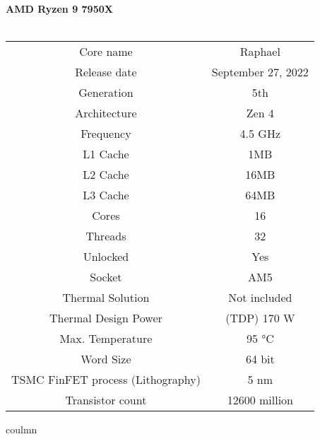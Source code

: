\documentclass[../computer-history.tex]{subfiles}
\begin{document}
\ \\ \\
\textbf{AMD Ryzen 9 7950X} \\ \\
\begin{tabular}{c|c}
    Core name & Raphael \\
    Release date & September 27, 2022 \\
    Generation & 5th \\
    Architecture & Zen 4 \\
    Frequency & 4.5 GHz \\
    L1 Cache & 1MB \\
    L2 Cache & 16MB \\
    L3 Cache & 64MB \\
    Cores & 16 \\
    Threads & 32 \\
    Unlocked & Yes \\
    Socket & AM5 \\
    Thermal Solution & Not included \\
    Thermal Design Power & (TDP)	170 W \\
    Max. Temperature & 95 °C \\
    Word Size & 64 bit \\
    TSMC FinFET process (Lithography) & 5 nm \\
    Transistor count & 12600 million \\
\end{tabular}
\two coulmn
\biblio
\end{document}

